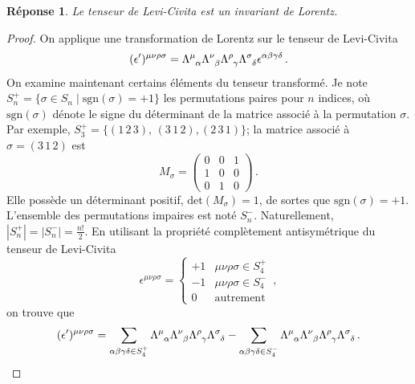 \documentclass{article}
\numberwithin{equation}{section}
\theoremstyle{solution}
\newtheorem{solution}{Réponse}[section]
\begin{document}

\begin{solution}
Le tenseur de Levi-Civita est un invariant de Lorentz.
\end{solution}
\begin{proof}
On applique une transformation de Lorentz sur le tenseur de Levi-Civita
\begin{align*}
        (\epsilon')^{\mu\nu\rho\sigma} = \Lambda\indices{^{\mu}_{\alpha}} \Lambda\indices{^{\nu}_{\beta}} \Lambda\indices{^{\rho}_{\gamma}} \Lambda\indices{^{\sigma}_{\delta}} \epsilon^{\alpha\beta\gamma\delta }\, .
\end{align*} 
On examine maintenant certains éléments du tenseur transformé. Je note $S_n^{+} = \{\sigma \in S_n \mid \mathrm{sgn}(\sigma) = +1\}$ les permutations paires 
pour $n$ indices, où $\mathrm{sgn}(\sigma)$ dénote le signe du déterminant de la matrice associé à la permutation $\sigma$.
Par exemple, $S_3^{+} = \{(1\, 2\, 3),\, (3\, 1\, 2), (2\, 3\, 1)\}$; la matrice associé 
à $\sigma = (3\, 1\, 2)$ est
\begin{equation*}
M_{\sigma} = \begin{pmatrix}
        0 & 0 & 1 \\
        1 & 0 & 0 \\
        0 & 1 & 0
\end{pmatrix}\, .
\end{equation*} 
Elle possède un déterminant positif, $\mathrm{det}(M_\sigma) = 1$, de sortes que $\mathrm{sgn}(\sigma) = +1$. 
L'ensemble des permutations impaires est noté $S_n^{-}$. Naturellement, $|S_n^{+}| = |S_n^{-}| = \frac{n!}{2}$. 
En utilisant la propriété complètement antisymétrique du tenseur de Levi-Civita
\begin{equation}
        \epsilon^{\mu\nu\rho\sigma} = \begin{cases}
                +1 & \mu\nu\rho\sigma \in S_4^{+} \\
                -1 & \mu\nu\rho\sigma \in S_4^{-} \\
                0 & \mathrm{autrement}
        \end{cases}\, ,
\end{equation} 
on trouve que
\begin{equation}
        (\epsilon')^{\mu\nu\rho\sigma} = 
        \sum_{\alpha\beta\gamma\delta \in S_4^{+}} 
 \Lambda\indices{^{\mu}_{\alpha}} \Lambda\indices{^{\nu}_{\beta}} \Lambda\indices{^{\rho}_{\gamma}} \Lambda\indices{^{\sigma}_{\delta}} 
-
        \sum_{\alpha\beta\gamma\delta \in S_4^{-}} 
 \Lambda\indices{^{\mu}_{\alpha}} \Lambda\indices{^{\nu}_{\beta}} \Lambda\indices{^{\rho}_{\gamma}} \Lambda\indices{^{\sigma}_{\delta}} \, .
\end{equation} 


\end{proof}
\end{document}
